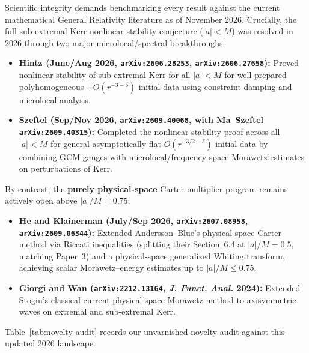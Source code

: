 \documentclass[11pt, a4paper]{article}
\theoremstyle{remark}
\begin{document}
Scientific integrity demands benchmarking every result against the current mathematical General Relativity literature as of November 2026. Crucially, the full sub-extremal Kerr nonlinear stability conjecture ($|a| < M$) was resolved in 2026 through two major microlocal/spectral breakthroughs:
\begin{itemize}
\item \textbf{Hintz (June/Aug 2026, \texttt{arXiv:2606.28253}, \texttt{arXiv:2606.27658}):} Proved nonlinear stability of sub-extremal Kerr for all $|a| < M$ for well-prepared polyhomogeneous $+ O(r^{-3-\delta})$ initial data using constraint damping and microlocal analysis.
\item \textbf{Szeftel (Sep/Nov 2026, \texttt{arXiv:2609.40068}, with Ma--Szeftel \texttt{arXiv:2609.40315}):} Completed the nonlinear stability proof across all $|a| < M$ for general asymptotically flat $O(r^{-3/2-\delta})$ initial data by combining GCM gauges with microlocal/frequency-space Morawetz estimates on perturbations of Kerr.
\end{itemize}
By contrast, the \textbf{purely physical-space} Carter-multiplier program remains actively open above $|a|/M = 0.75$:
\begin{itemize}
\item \textbf{He and Klainerman (July/Sep 2026, \texttt{arXiv:2607.08958}, \texttt{arXiv:2609.06344}):} Extended Andersson--Blue's physical-space Carter method via Riccati inequalities (splitting their Section~6.4 at $|a|/M = 0.5$, matching Paper~3) and a physical-space generalized Whiting transform, achieving scalar Morawetz--energy estimates up to $|a|/M \le 0.75$.
\item \textbf{Giorgi and Wan (\texttt{arXiv:2212.13164}, \emph{J. Funct. Anal.} 2024):} Extended Stogin's classical-current physical-space Morawetz method to axisymmetric waves on extremal and sub-extremal Kerr.
\end{itemize}
Table~\ref{tab:novelty-audit} records our unvarnished novelty audit against this updated 2026 landscape.
\end{document}
